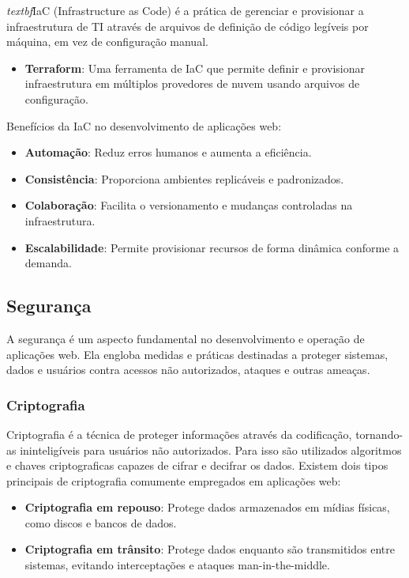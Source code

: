 \emph{textbf}{IaC (Infrastructure as Code)} é a prática de gerenciar e provisionar a infraestrutura de TI através de arquivos de definição de código legíveis por máquina, em vez de configuração manual.

\begin{itemize}
    \item \textbf{Terraform}: Uma ferramenta de IaC que permite definir e provisionar infraestrutura em múltiplos provedores de nuvem usando arquivos de configuração.
\end{itemize}

Benefícios da IaC no desenvolvimento de aplicações web:

\begin{itemize}
    \item \textbf{Automação}: Reduz erros humanos e aumenta a eficiência.
    \item \textbf{Consistência}: Proporciona ambientes replicáveis e padronizados.
    \item \textbf{Colaboração}: Facilita o versionamento e mudanças controladas na infraestrutura.
    \item \textbf{Escalabilidade}: Permite provisionar recursos de forma dinâmica conforme a demanda.
\end{itemize}

\subsection{Segurança}

A segurança é um aspecto fundamental no desenvolvimento e operação de aplicações web. Ela engloba medidas e práticas destinadas a proteger sistemas, dados e usuários contra acessos não autorizados, ataques e outras ameaças.


\subsubsection{Criptografia}

Criptografia é a técnica de proteger informações através da codificação, tornando-as ininteligíveis para usuários não autorizados. Para isso são utilizados algoritmos e chaves criptograficas capazes de cifrar e decifrar os dados. Existem dois tipos principais de criptografia comumente empregados em aplicações web:

\begin{itemize}
    \item \textbf{Criptografia em repouso}: Protege dados armazenados em mídias físicas, como discos e bancos de dados.
    \item \textbf{Criptografia em trânsito}: Protege dados enquanto são transmitidos entre sistemas, evitando interceptações e ataques man-in-the-middle.
\end{itemize}

